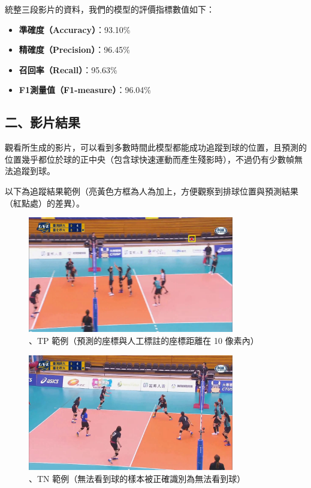 統整三段影片的資料，我們的模型的評價指標數值如下：

\begin{itemize}
    \item []\textbf{準確度（Accuracy）}：93.10\%
    \item []\textbf{精確度（Precision）}：96.45\%
    \item []\textbf{召回率（Recall）}：95.63\%
    \item []\textbf{F1測量值（F1-measure）}：96.04\%
\end{itemize}

\subsection{二、影片結果}

觀看所生成的影片，可以看到多數時間此模型都能成功追蹤到球的位置，且預測的位置幾乎都位於球的正中央（包含球快速運動而產生殘影時），不過仍有少數幀無法追蹤到球。

以下為追蹤結果範例（亮黃色方框為人為加上，方便觀察到排球位置與預測結果（紅點處）的差異）。

\begin{figure}[H]
    \centering
    \includegraphics[width = 9cm]{picture/TP.jpg}
    \caption{、TP 範例（預測的座標與人工標註的座標距離在 10 像素內）}
    \label{TP}
\end{figure}

\begin{figure}[H]
    \centering
    \includegraphics[width = 9cm]{picture/TN.jpg}
    \caption{、TN 範例（無法看到球的樣本被正確識別為無法看到球）}
    \label{TN}
\end{figure}

